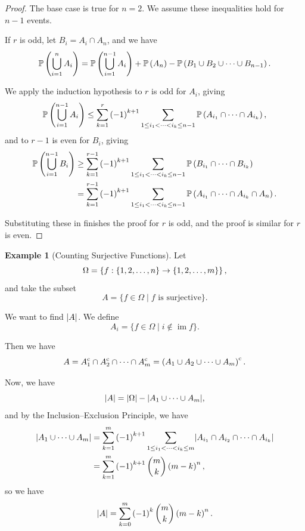 \documentclass{article}
\theoremstyle{definition}
\newtheorem{example}[theorem]{Example}
\theoremstyle{remark}
\DeclarePairedDelimiter{\abs}{\lvert}{\rvert}
\newcommand{\Prob}{\mathbb{P}}
\newcommand{\compl}{^{\mathrm{c}}}
\newcommand{\set}[2]{\{#1\mid #2\}}
\newcommand{\functiondomain}[3]{#1:#2\to #3}
\newcommand{\img}{\operatorname{im}}
\begin{document}
\begin{proof}
    The base case is true for \(n = 2\). We assume these inequalities hold for \(n - 1\) events.

    If \(r\) is odd, let \(B_i = A_i \cap A_n\), and we have
    \[
        \Prob\pqty{\bigcup_{i = 1}^{n} A_i} = \Prob\pqty{\bigcup_{i = 1}^{n - 1} A_i} + \Prob\pqty{A_n} - \Prob\pqty{B_1 \cup B_2 \cup \cdots \cup B_{n - 1}}.
    \]

    We apply the induction hypothesis to \(r\) is odd for \(A_i\), giving
    \[
        \Prob\pqty{\bigcup_{i = 1}^{n - 1} A_i} \leq \sum_{k = 1}^{r} \pqty{-1}^{k + 1} \sum_{1 \leq i_1 < \cdots < i_k \leq n - 1} \Prob\pqty{A_{i_1} \cap \cdots \cap A_{i_k}},
    \]
    and to \(r - 1\) is even for \(B_i\), giving
    \begin{align*}
        \Prob\pqty{\bigcup_{i = 1}^{n - 1} B_i} &\geq \sum_{k = 1}^{r - 1} \pqty{-1}^{k + 1} \sum_{1 \leq i_1 < \cdots < i_k \leq n - 1} \Prob\pqty{B_{i_1} \cap \cdots \cap B_{i_k}} \\
        &= \sum_{k = 1}^{r - 1} \pqty{-1}^{k + 1} \sum_{1 \leq i_1 < \cdots < i_k \leq n - 1} \Prob\pqty{A_{i_1} \cap \cdots \cap A_{i_k} \cap A_n}.
    \end{align*}

    Substituting these in finishes the proof for \(r\) is odd, and the proof is similar for \(r\) is even.
\end{proof}

\begin{example}[Counting Surjective Functions]
    \label{ex:counting-surjections}%
    Let
    \[
        \Omega = \Bqty{\functiondomain{f}{\Bqty{1, 2, \ldots, n}}{\Bqty{1, 2, \ldots, m}}},
    \]
    and take the subset
    \[
        A = \set{f \in \Omega}{f \text{ is surjective}}.
    \]

    We want to find \(\abs{A}\). We define
    \[
        A_i = \set{f \in \Omega}{i \notin \img f}.
    \]

    Then we have
    \[
        A = A_1\compl \cap A_2\compl \cap \cdots \cap A_m\compl = \pqty{A_1 \cup A_2 \cup \cdots \cup A_m}\compl.
    \]

    Now, we have
    \[
        \abs{A} = \abs{\Omega} - \abs{A_1 \cup \cdots \cup A_m},
    \]
    and by the Inclusion--Exclusion Principle, we have
    \begin{align*}
        \abs{A_1 \cup \cdots \cup A_m} &= \sum_{k = 1}^{m} \pqty{-1}^{k + 1} \sum_{1 \leq i_1 < \cdots < i_k \leq m} \abs{A_{i_1} \cap A_{i_2} \cap \cdots \cap A_{i_k}} \\
        &= \sum_{k = 1}^{m} \pqty{-1}^{k + 1} \binom{m}{k} \pqty{m - k}^n,
    \end{align*}
    so we have
    \[
        \abs{A} = \sum_{k = 0}^{m} \pqty{-1}^{k} \binom{m}{k} \pqty{m - k}^{n}.
    \]
\end{example}
\end{document}
